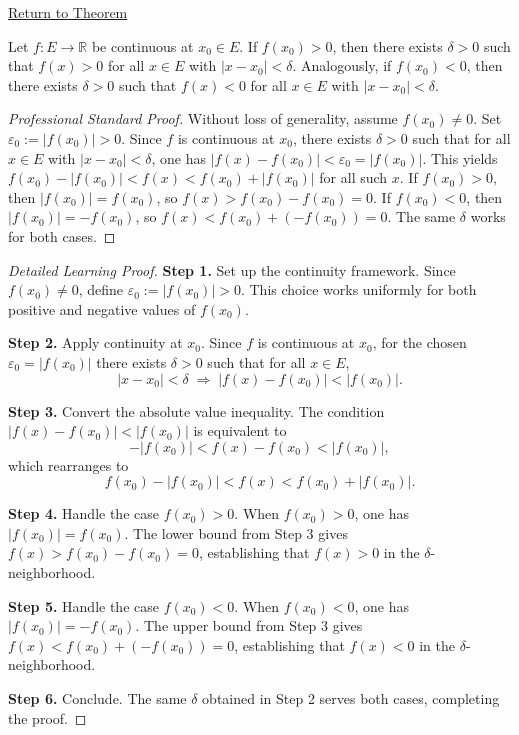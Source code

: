 \newpage
{}
\label{prf:sign-preservation}

\begin{remark*}[Return]
\hyperref[prop:sign-preservation]{Return to Theorem}
\end{remark*}

\begin{theorem*}
Let $f : E \to \mathbb{R}$ be continuous at $x_0 \in E$.
If $f(x_0) > 0$, then there exists $\delta > 0$ such that
$f(x) > 0$ for all $x \in E$ with $|x - x_0| < \delta$.
Analogously, if $f(x_0) < 0$, then there exists $\delta > 0$ such that
$f(x) < 0$ for all $x \in E$ with $|x - x_0| < \delta$.
\end{theorem*}

\begin{proof}[Professional Standard Proof]
\LRAProofBodyStart
Without loss of generality, assume $f(x_0) \neq 0$. Set $\varepsilon_0 := |f(x_0)| > 0$. Since $f$ is continuous at $x_0$, there exists $\delta > 0$ such that for all $x \in E$ with $|x - x_0| < \delta$, one has $|f(x) - f(x_0)| < \varepsilon_0 = |f(x_0)|$. This yields $f(x_0) - |f(x_0)| < f(x) < f(x_0) + |f(x_0)|$ for all such $x$. If $f(x_0) > 0$, then $|f(x_0)| = f(x_0)$, so $f(x) > f(x_0) - f(x_0) = 0$. If $f(x_0) < 0$, then $|f(x_0)| = -f(x_0)$, so $f(x) < f(x_0) + (-f(x_0)) = 0$. The same $\delta$ works for both cases.
\end{proof}

\begin{proof}[Detailed Learning Proof]
\LRAProofBodyStart

\textbf{Step 1.} Set up the continuity framework. Since $f(x_0) \neq 0$, define $\varepsilon_0 := |f(x_0)| > 0$. This choice works uniformly for both positive and negative values of $f(x_0)$.

\textbf{Step 2.} Apply continuity at $x_0$. Since $f$ is continuous at $x_0$, for the chosen $\varepsilon_0 = |f(x_0)|$ there exists $\delta > 0$ such that for all $x \in E$,
\[
  |x - x_0| < \delta \;\Rightarrow\; |f(x) - f(x_0)| < |f(x_0)|.
\]

\textbf{Step 3.} Convert the absolute value inequality. The condition $|f(x) - f(x_0)| < |f(x_0)|$ is equivalent to
\[
  -|f(x_0)| < f(x) - f(x_0) < |f(x_0)|,
\]
which rearranges to
\[
  f(x_0) - |f(x_0)| < f(x) < f(x_0) + |f(x_0)|.
\]

\textbf{Step 4.} Handle the case $f(x_0) > 0$. When $f(x_0) > 0$, one has $|f(x_0)| = f(x_0)$. The lower bound from Step 3 gives $f(x) > f(x_0) - f(x_0) = 0$, establishing that $f(x) > 0$ in the $\delta$-neighborhood.

\textbf{Step 5.} Handle the case $f(x_0) < 0$. When $f(x_0) < 0$, one has $|f(x_0)| = -f(x_0)$. The upper bound from Step 3 gives $f(x) < f(x_0) + (-f(x_0)) = 0$, establishing that $f(x) < 0$ in the $\delta$-neighborhood.

\textbf{Step 6.} Conclude. The same $\delta$ obtained in Step 2 serves both cases, completing the proof.
\end{proof}

